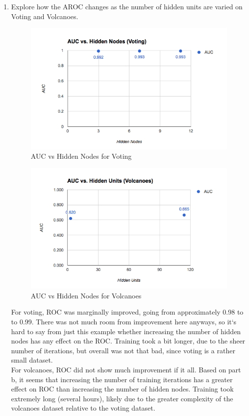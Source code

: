 \documentclass[12pt]{article}
\begin{document}
\begin{enumerate}
  \item Explore how the AROC changes as the number of hidden units are varied
  on Voting and Volcanoes.\\
    \begin{figure}
      \includegraphics[width=\linewidth]{auc_nodes_vote.png}
      \caption{AUC vs Hidden Nodes for Voting}
    \end{figure}
    \begin{figure}
      \includegraphics[width=\linewidth]{auc_nodes_volc.png}
      \caption{AUC vs Hidden Nodes for Volcanoes}
    \end{figure}
    For voting, ROC was marginally improved, going from approximately 0.98 to
    to 0.99. There was not much room from improvement here anyways, so it`s
    hard to say from just this example whether increasing the number of hidden
    nodes has any effect on the ROC. Training took a bit longer, due to the
    sheer number of iterations, but overall was not that bad, since voting is
    a rather small dataset.\\
    For volcanoes, ROC did not show much improvement if it all. Based on part
    b, it seems that increasing the number of training iterations has a greater
    effect on ROC than increasing the number of hidden nodes. Training took
    extremely long (several hours), likely due to the greater complexity of the
    volcanoes dataset relative to the voting dataset.


\end{enumerate}
\end{document}
